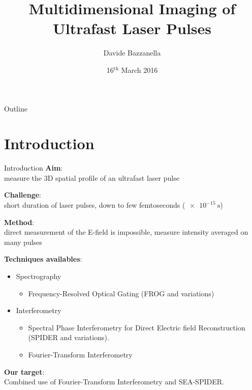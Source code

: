 \documentclass[11pt]{beamer}
\author{Davide Bazzanella}
\title{Multidimensional Imaging of Ultrafast Laser Pulses}
\institute{Imperial College London}
\date{16$^{\mathrm{th}}$ March 2016}
\begin{document}
\begin{frame}
\titlepage
\end{frame}

\begin{frame}{Outline}
\tableofcontents
\end{frame}

\section{Introduction}
\begin{frame}{Introduction}
\textbf{Aim}:\\
	measure the 3D spatial profile of an ultrafast laser pulse

	\vspace{15pt}
\textbf{Challenge}:\\
	short duration of laser pulses, down to few femtoseconds ($\SI{e-15}{\s}$)
	
	\vspace{15pt}
\textbf{Method}:\\
	direct measurement of the E-field is impossible,
	measure intensity averaged on many pulses
\end{frame}

\begin{frame}

\textbf{Techniques availables}:\\
\begin{itemize}
\item Spectrography
\begin{itemize}
\item Frequency-Resolved Optical Gating (FROG and variations)
\end{itemize}
\item Interferometry
\begin{itemize}
\item Spectral Phase Interferometry for Direct Electric field Reconstruction (SPIDER and variations).
\item Fourier-Transform Interferometry
\end{itemize}
\end{itemize}	

\textbf{Our target}:\\
Combined use of Fourier-Transform Interferometry and SEA-SPIDER.


\end{frame}
\end{document}

